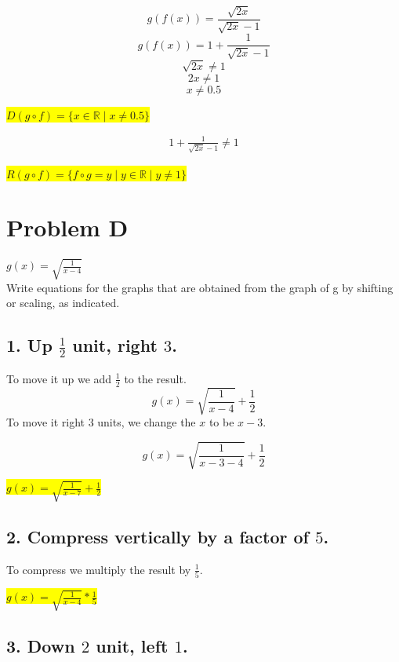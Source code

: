 \documentclass{article}
\begin{document}
\[
g(f(x)) = \frac{\sqrt{2x}}{\sqrt{2x} - 1}
\]
\[
g(f(x)) = 1 + \frac{1}{\sqrt{2x} - 1}
\]
\[
\sqrt{2x} \neq 1
\]
\[
2x \neq 1
\]
\[
x \neq 0.5
\]

\begin{center}
\colorbox{yellow}{$D(g \circ f) = \{ x \in \mathbb{R} \mid x \neq 0.5 \}$}
\end{center}

\[
\begin{aligned}
1 + \frac{1}{\sqrt{2x} - 1} \neq 1
\end{aligned}
\]

\begin{center}
\colorbox{yellow}{$R(g \circ f) = \{ f \circ g = y \mid y \in \mathbb{R} \mid y \neq 1 \}$}
\end{center}

\section*{Problem D}
$g(x) = \sqrt{\frac{1}{x-4}}$ \\
Write equations for the graphs that are obtained from the graph of g by shifting or scaling, as indicated.

\subsection*{1. Up $\frac{1}{2}$ unit, right $3$.}

To move it up we add $\frac{1}{2}$ to the result.
\[
g(x) = \sqrt{\frac{1}{x-4}} + \frac{1}{2}
\]
To move it right 3 units, we change the $x$ to be $x-3$.

\[
g(x) = \sqrt{\frac{1}{x - 3 - 4}} + \frac{1}{2}
\]

\begin{center}
\colorbox{yellow}{$g(x) = \sqrt{\frac{1}{x - 7}} + \frac{1}{2}$}
\end{center}

\subsection*{2. Compress vertically by a factor of $5$.}

To compress we multiply the result by $\frac{1}{5}$.

\begin{center}
\colorbox{yellow}{$g(x) = \sqrt{\frac{1}{x-4}} * \frac{1}{5}$}
\end{center}

\subsection*{3. Down $2$ unit, left $1$.}
\end{document}
